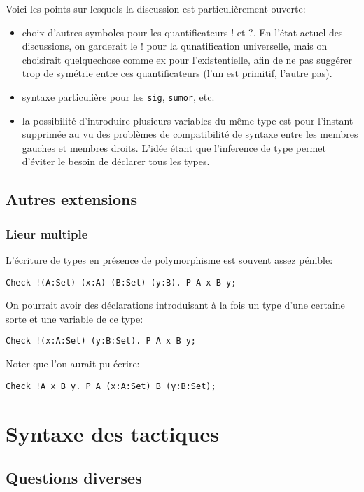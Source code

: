 \documentclass{article}
\def\TERM#1{\textsf{#1}}
\begin{document}
Voici les points sur lesquels la discussion est particulièrement
ouverte: 
\begin{itemize}
\item choix d'autres symboles pour les quantificateurs \TERM{!} et
  \TERM{?}. En l'état actuel des discussions, on garderait le \TERM{!}
  pour la qunatification universelle, mais on choisirait quelquechose
  comme \TERM{ex} pour l'existentielle, afin de ne pas suggérer trop
  de symétrie entre ces quantificateurs (l'un est primitif, l'autre
  pas).
\item syntaxe particulière pour les \texttt{sig}, \texttt{sumor}, etc.
\item la possibilité d'introduire plusieurs variables du même type est
  pour l'instant supprimée au vu des problèmes de compatibilité de
  syntaxe entre les membres gauches et membres droits. L'idée étant
  que l'inference de type permet d'éviter le besoin de déclarer tous
  les types.
\end{itemize}

\subsection{Autres extensions}

\subsubsection{Lieur multiple}

L'écriture de types en présence de polymorphisme est souvent assez
pénible:
\begin{verbatim}
Check !(A:Set) (x:A) (B:Set) (y:B). P A x B y;
\end{verbatim}

On pourrait avoir des déclarations introduisant à la fois un type
d'une certaine sorte et une variable de ce type:
\begin{verbatim}
Check !(x:A:Set) (y:B:Set). P A x B y;
\end{verbatim}

Noter que l'on aurait pu écrire:
\begin{verbatim}
Check !A x B y. P A (x:A:Set) B (y:B:Set);
\end{verbatim}

\section{Syntaxe des tactiques}

\subsection{Questions diverses}
\end{document}
